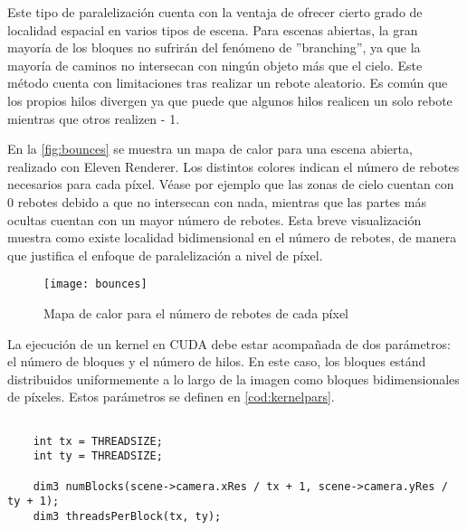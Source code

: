 Este tipo de paralelización cuenta con la ventaja de ofrecer cierto grado de localidad espacial en varios tipos de escena. Para escenas abiertas, la gran mayoría de los bloques no sufrirán del fenómeno de ''branching'', ya que la mayoría de caminos no intersecan con ningún objeto más que el cielo. Este método cuenta con limitaciones tras realizar un rebote aleatorio. Es común que los propios hilos divergen ya que puede que algunos hilos realicen un solo rebote mientras que otros realizen  - 1.

En la \autoref{fig:bounces} se muestra un mapa de calor para una escena abierta, realizado con Eleven Renderer. Los distintos colores indican el número de rebotes necesarios para cada píxel. Véase por ejemplo que las zonas de cielo cuentan con 0 rebotes debido a que no intersecan con nada, mientras que las partes más ocultas cuentan con un mayor número de rebotes. Esta breve visualización muestra como existe localidad bidimensional en el número de rebotes, de manera que justifica el enfoque de paralelización a nivel de píxel.

\begin{figure}[H]
\label{fig:bounces}
	\centering
	\texttt{[image: bounces]}
	
	\colorbox{red}{\strut \color{white}{0 bounces}}
	\colorbox{yellow}{\strut \color{black}{1 bounce}}
	\colorbox{green}{\strut \color{black}{2 bounces}}
	\colorbox{blue}{\strut \color{white}{3 bounces}}
	\colorbox{purple}{\strut \color{white}{4 bounces}}

	\caption{Mapa de calor para el número de rebotes de cada píxel}
\end{figure}

La ejecución de un kernel en CUDA debe estar acompañada de dos parámetros: el número de bloques y el número de hilos. En este caso, los bloques estánd distribuidos uniformemente a lo largo de la imagen como bloques bidimensionales de  píxeles. Estos parámetros se definen en \autoref{cod:kernelpars}.

\begin{minipage}[c]{0.95\textwidth}
\begin{lstlisting}[label={cod:kernelpars}, caption={Selección de parámetros para el kernel principal}]
	
    int tx = THREADSIZE;
    int ty = THREADSIZE;

    dim3 numBlocks(scene->camera.xRes / tx + 1, scene->camera.yRes / ty + 1);
    dim3 threadsPerBlock(tx, ty);
	
\end{lstlisting}
\end{minipage}

